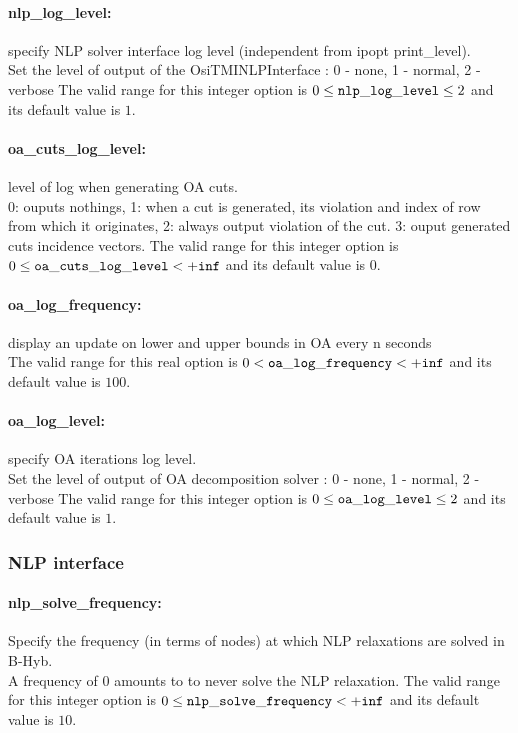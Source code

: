 \paragraph{nlp\_log\_level:} specify NLP solver interface log level (independent from ipopt print\_level). $\;$ \\
 Set the level of output of the OsiTMINLPInterface
: 0 - none, 1 - normal, 2 - verbose The valid range for this integer option is
$0 \le {\tt nlp\_log\_level } \le 2$
and its default value is $1$.

\paragraph{oa\_cuts\_log\_level:} level of log when generating OA cuts. $\;$ \\
 0: ouputs nothings,
1: when a cut is generated,
its violation and index of row from which it
originates,
2: always output violation of the
cut.
3: ouput generated cuts incidence vectors. The valid range for this integer option is
$0 \le {\tt oa\_cuts\_log\_level } <  {\tt +inf}$
and its default value is $0$.

\paragraph{oa\_log\_frequency:} display an update on lower and upper bounds in OA every n seconds $\;$ \\
 The valid range for this real option is 
$0 <  {\tt oa\_log\_frequency } <  {\tt +inf}$
and its default value is $100$.


\paragraph{oa\_log\_level:} specify OA iterations log level. $\;$ \\
 Set the level of output of OA decomposition
solver : 0 - none, 1 - normal, 2 - verbose The valid range for this integer option is
$0 \le {\tt oa\_log\_level } \le 2$
and its default value is $1$.


\subsubsection{NLP interface}
\label{sec:bonmin_nlp_interface_option}
\label{sec:bonmin_options_:_Nlp_solve_options}

\paragraph{nlp\_solve\_frequency:} Specify the frequency (in terms of nodes) at which NLP relaxations are solved in B-Hyb. $\;$ \\
 A frequency of 0 amounts to to never solve the
NLP relaxation. The valid range for this integer option is
$0 \le {\tt nlp\_solve\_frequency } <  {\tt +inf}$
and its default value is $10$.



